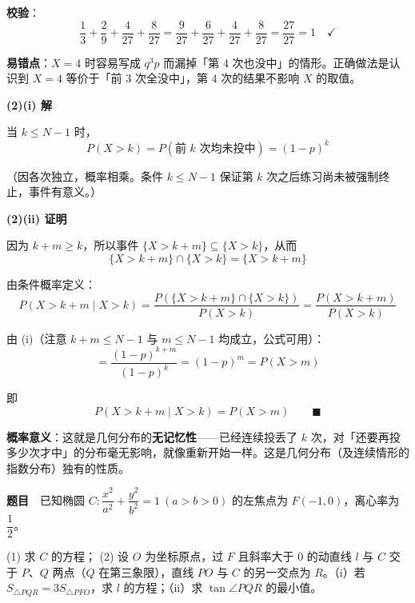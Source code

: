 \textbf{校验}：
\[\frac13+\frac29+\frac4{27}+\frac8{27}=\frac{9}{27}+\frac{6}{27}+\frac{4}{27}+\frac{8}{27}=\frac{27}{27}=1\quad\checkmark\]

\begin{gktip}
\textbf{易错点}：$X=4$ 时容易写成 $q^3p$ 而漏掉「第 4 次也没中」的情形。正确做法是认识到 $X=4$ 等价于「前 3 次全没中」，第 4 次的结果不影响 $X$ 的取值。
\end{gktip}

\par\medskip

\textbf{(2)(i) 解}

当 $k\le N-1$ 时，
\[P(X>k)=P(\text{前 }k\text{ 次均未投中})=(1-p)^k\]

（因各次独立，概率相乘。条件 $k\le N-1$ 保证第 $k$ 次之后练习尚未被强制终止，事件有意义。）

\par\medskip

\textbf{(2)(ii) 证明}

因为 $k+m\ge k$，所以事件 $\{X>k+m\}\subseteq\{X>k\}$，从而
\[\{X>k+m\}\cap\{X>k\}=\{X>k+m\}\]

由条件概率定义：
\[P(X>k+m\mid X>k)=\frac{P\left(\{X>k+m\}\cap\{X>k\}\right)}{P(X>k)}=\frac{P(X>k+m)}{P(X>k)}\]

由 (i)（注意 $k+m\le N-1$ 与 $m\le N-1$ 均成立，公式可用）：
\[=\frac{(1-p)^{k+m}}{(1-p)^{k}}=(1-p)^{m}=P(X>m)\]

即
\[P(X>k+m\mid X>k)=P(X>m)\qquad\blacksquare\]

\begin{gktip}
\textbf{概率意义}：这就是几何分布的\textbf{无记忆性}——已经连续投丢了 $k$ 次，对「还要再投多少次才中」的分布毫无影响，就像重新开始一样。这是几何分布（及连续情形的指数分布）独有的性质。
\end{gktip}

\par\medskip


\textbf{题目}　已知椭圆 $C:\dfrac{x^2}{a^2}+\dfrac{y^2}{b^2}=1\ (a>b>0)$ 的左焦点为 $F(-1,0)$，离心率为 $\dfrac12$。

  (1) 求 $C$ 的方程；
  (2) 设 $O$ 为坐标原点，过 $F$ 且斜率大于 $0$ 的动直线 $l$ 与 $C$ 交于 $P$、$Q$ 两点（$Q$ 在第三象限），直线 $PO$ 与 $C$ 的另一交点为 $R$。（i）若 $S_{\triangle PQR}=3S_{\triangle PFO}$，求 $l$ 的方程；（ii）求 $\tan\angle PQR$ 的最小值。

\par\medskip


